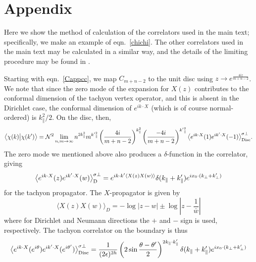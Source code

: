 \documentclass[letterpaper,12pt]{article}
\def\Pcm#1{{\mathcal{#1}}}
\def\er#1{eqn.~\eqref{#1}}
\begin{document}

\setcounter{equation}{0}
\renewcommand{\theequation}{A-\arabic{equation}}
\section*{Appendix}

Here we show the method of calculation of the correlators used in the main text;
specifically, we make an example of \er{chichi}. %
The other correlators used in the main text may be calculated in a similar way,
and the details of the limiting procedure may be found in \cite{RV}.

Starting with \er{Cappcc}, we map $C_{m+n-2}$ to the unit disc 
using $z \rightarrow e^{\frac{4iz}{m+n-2}}$.
We note that since the zero mode of the expansion for $X(z)$ contributes to the
conformal dimension of the tachyon vertex operator, and this is 
absent in the Dirichlet case, the conformal dimension of $e^{ik\cdot X}$ 
(which is of course normal-ordered) is $k_\parallel^2/2$.
On the disc, then,
\begin{equation}
\label{chch}
\big\langle\chi(k)\big|\chi(k')\big\rangle
=\Pcm{N}^2 \lim_{n,m\rightarrow\infty} n^{2k_\parallel^2}m^{{k'}_\parallel^2}
\left(\frac{4i}{m+n-2}\right)^{k_\parallel^2}
\left(\frac{-4i}{m+n-2}\right)^{{k'}_\parallel^2}
\big\langle
e^{ik\cdot X}(1)
e^{ik'\cdot X}(-1)
\big\rangle^{\sigma\perp}_{\textup{Disc}}
.\end{equation}
The zero mode we mentioned above also produces a $\delta$-function in the correlator,~\cite{Pol} giving
\begin{equation}
\big\langle e^{ik\cdot X}(z)e^{ik'\cdot X}(w)\big\rangle^{\sigma\perp}_{\textup{D}}
 = e^{i k\cdot k' \langle X(z)X(w)\rangle}
 \delta(k_\parallel+k_\parallel')
 e^{ix_0\cdot (k_\perp+k_\perp')}
\end{equation}
for the tachyon propagator. The $X$-propagator is given by
\begin{equation}
\big\langle X(z)X(w) \big\rangle_D = -\log |z-w| \pm \log \left|z-\frac1{\bar{w}}\right|
\end{equation}
where for Dirichlet and Neumann directions the $+$ and $-$ sign is used, respectively.
The tachyon correlator on the boundary is thus
\begin{equation}
\label{DiscTwoCorr}
\big\langle e^{ik\cdot X}(e^{i\theta})e^{ik'\cdot X}(e^{i\theta'})\big\rangle^{\sigma\perp}_{\textup{Disc}}
 = \frac{1}{(2\epsilon)^{2h}}\left(2\sin \frac{\theta-\theta'}2\right)^{2k_\parallel\cdot k'_\parallel}
 \delta(k_\parallel+k_\parallel')
 e^{ix_0\cdot (k_\perp+k_\perp')}
\end{equation}
\end{document}
